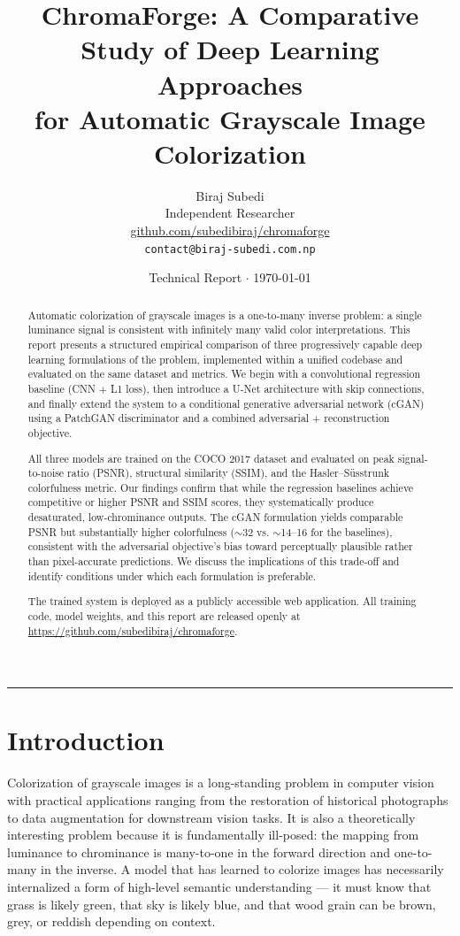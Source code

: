 \documentclass[11pt,a4paper]{article}
\title{
    \vspace{-1cm}
    {\LARGE \textbf{ChromaForge: A Comparative Study of Deep Learning Approaches\\[4pt]
    for Automatic Grayscale Image Colorization}}
}
\author{
    Biraj Subedi \\
    \small Independent Researcher \\
    \small \href{https://github.com/subedibiraj/chromaforge}{github.com/subedibiraj/chromaforge} \\
    \small \texttt{contact@biraj-subedi.com.np}
}
\date{Technical Report $\cdot$ \today}
\begin{document}
\maketitle

\begin{abstract}
Automatic colorization of grayscale images is a one-to-many inverse problem: a
single luminance signal is consistent with infinitely many valid color
interpretations. This report presents a structured empirical comparison of three
progressively capable deep learning formulations of the problem, implemented
within a unified codebase and evaluated on the same dataset and metrics.
We begin with a convolutional regression baseline (CNN + L1 loss), then introduce
a U-Net architecture with skip connections, and finally extend the system to a
conditional generative adversarial network (cGAN) using a PatchGAN discriminator
and a combined adversarial + reconstruction objective.

All three models are trained on the COCO 2017 dataset and
evaluated on peak signal-to-noise ratio (PSNR), structural similarity (SSIM),
and the Hasler--S\"usstrunk colorfulness metric. Our findings confirm that while
the regression baselines achieve competitive or higher PSNR and SSIM scores, they
systematically produce desaturated, low-chrominance outputs. The cGAN formulation
yields comparable PSNR but substantially higher colorfulness ($\sim$32 vs.
$\sim$14--16 for the baselines), consistent with the adversarial objective's
bias toward perceptually plausible rather than pixel-accurate predictions. We
discuss the implications of this trade-off and identify conditions under which
each formulation is preferable.

The trained system is deployed as a publicly accessible web application. All
training code, model weights, and this report are released openly at
\url{https://github.com/subedibiraj/chromaforge}.
\end{abstract}

\vspace{0.5em}
\hrule
\vspace{1em}

\section{Introduction}

Colorization of grayscale images is a long-standing problem in computer vision
with practical applications ranging from the restoration of historical photographs
to data augmentation for downstream vision tasks. It is also a theoretically
interesting problem because it is fundamentally ill-posed: the mapping from
luminance to chrominance is many-to-one in the forward direction and
one-to-many in the inverse. A model that has learned to colorize images has
necessarily internalized a form of high-level semantic understanding — it must
know that grass is likely green, that sky is likely blue, and that wood grain
can be brown, grey, or reddish depending on context.
\end{document}
